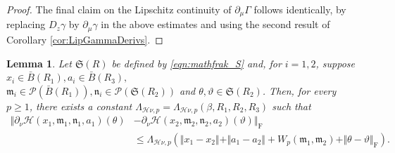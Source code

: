 \documentclass{article}
\newtheorem{lemma}[theorem]{Lemma}
\begin{document}
\begin{appendices}
\begin{proof}
    The final claim on the Lipschitz continuity of $\partial_\mu \Gamma$ follows identically, by replacing $D_z\gamma$ by $\partial_\mu\gamma$ in the above estimates and using the second result of Corollary \ref{cor:LipGammaDerivs}.
\end{proof}
\begin{lemma}\label{lemma:LipmathcalHnu}
Let $\mathfrak{S}(R)$ be defined by \ref{eqn:mathfrak_S} and, for $i=1,2$, suppose $x_i\in \bar B(R_1), a_i \in \bar B(R_3),$\\$ \mathfrak{m}_i\in \mathcal P(\bar B(R_1)), \mathfrak{n}_i\in \mathcal P(\mathfrak{S}(R_2))$ and  $\theta,\vartheta\in \mathfrak{S}(R_2)$. Then, for every $p\ge 1$, there exists a constant $\Lambda_{\mathcal H\nu,p}=\Lambda_{\mathcal H\nu,p}(\beta,R_1,R_2,R_3)$ such that 
    \begin{align*}
            \Vert \partial_\nu\mathcal H(x_1,\mathfrak{m}_1,\mathfrak{n}_1,a_1)(\theta)&-\partial_\nu\mathcal H(x_2,\mathfrak{m}_2,\mathfrak{n}_2,a_2)(\vartheta)\Vert_\mathrm{F}\\&\le \Lambda_{\mathcal H\nu,p}\left(\Vert x_1-x_2\Vert+ \Vert a_1-a_2\Vert+ W_p(\mathfrak{m}_1,\mathfrak{m}_2)+ \Vert \theta-\vartheta\Vert_\mathrm{F}\right).
    \end{align*}


\end{lemma}
\end{appendices}
\end{document}
